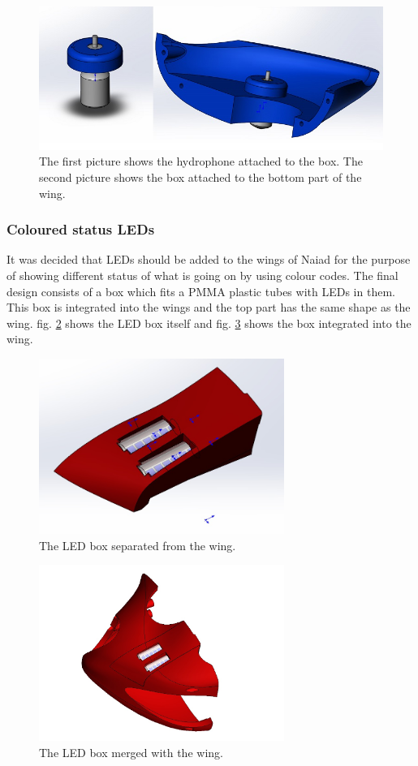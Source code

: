 	\begin{figure}[!ht]
	\begin{center}
		\includegraphics[width=150mm]{./Images/Mechanics/Hydrobox.JPG}
		\caption{The first picture shows the hydrophone attached to the box. The second picture shows the box attached to the bottom part of the wing.}
		\label{hydrobox}
	\end{center}
\end{figure}

	\subsubsection{Coloured status LEDs}
\noindent It was decided that LEDs should be added to the wings of Naiad for the purpose of showing different status of what is going on by using colour codes. The final design consists of a box which fits a PMMA plastic tubes with LEDs in them. This box is integrated into the wings and the top part has the same shape as the wing. 
fig. \ref{hejhej} shows the LED box itself and fig. \ref{hejhejs} shows the box integrated into the wing. 

\begin{figure}[!ht]
	\begin{center}
		\includegraphics[width=80mm]{./Images/Mechanics/LED_box_with_LEDS.jpg}
		\caption{The LED box separated from the wing.}
		\label{hejhej}
	\end{center}
\end{figure}

\begin{figure}[!ht]
	\begin{center}
		\includegraphics[width=80mm]{./Images/Mechanics/Right_Wing_with_LED_box.jpg}
		\caption{The LED box merged with the wing.}
		\label{hejhejs}
	\end{center}
\end{figure}
